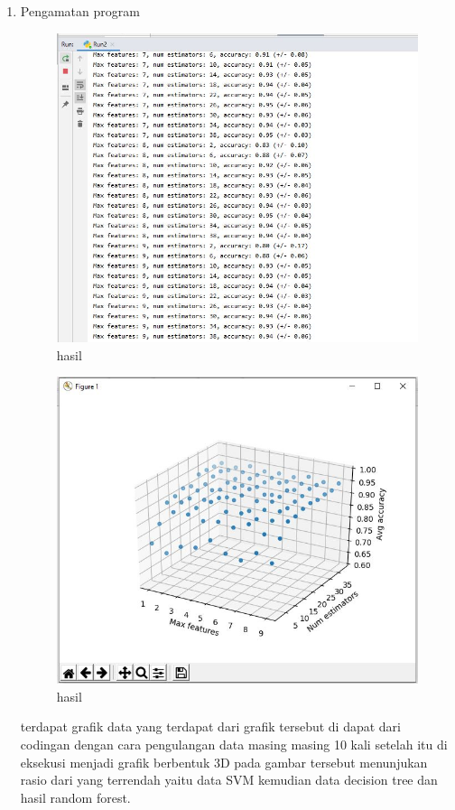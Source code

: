 \begin{enumerate}
\item Pengamatan program 

\begin{figure}[ht]
\centering
\includegraphics[scale=0.5]{figures/1174042/chapter4/2,8.JPG}
\caption{hasil}
\label{Praktek no 8}
\end{figure}

\begin{figure}[ht]
\centering
\includegraphics[scale=0.5]{figures/1174042/chapter4/2,8,1.JPG}
\caption{hasil}
\label{Praktek no 8}
\end{figure}
terdapat grafik data yang terdapat dari grafik tersebut di dapat dari codingan dengan cara pengulangan data masing masing 10 kali setelah itu di eksekusi menjadi grafik berbentuk 3D pada gambar tersebut menunjukan rasio dari yang terrendah yaitu data SVM kemudian data decision tree dan hasil random forest.

\end{enumerate}


